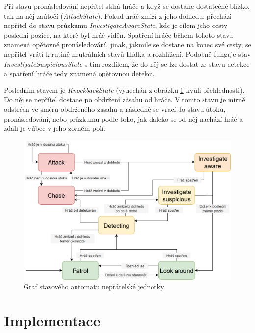 \documentclass[FM,Proj]{tulthesis}
\begin{document}
	Při stavu pronásledování nepřítel stíhá hráče a když se dostane dostatečně blízko, tak na něj zaútočí (\textit{AttackState}). Pokud hráč zmizí z jeho dohledu, přechází nepřítel do stavu průzkumu \textit{InvestigateAwareState}, kde je cílem jeho cesty poslední pozice, na které byl hráč viděn. Spatření hráče během tohoto stavu znamená opětovné pronásledování, jinak, jakmile se dostane na konec své cesty, se nepřítel vrátí k rutině neutrálních stavů hlídka a rozhlížení. Podobně funguje stav \textit{InvestigateSuspiciousState} s tím rozdílem, že do něj se lze dostat ze stavu detekce a spatření hráče tedy znamená opětovnou detekci.
	
	Posledním stavem je \textit{KnockbackState} (vynechán z obrázku \ref{imgFSM} kvůli přehlednosti). Do něj se nepřítel dostane po obdržení zásahu od hráče. V tomto stavu je mírně odstrčen ve směru obdrženého zásahu a následně se vrací do stavu útoku, pronásledování, nebo průzkumu podle toho, jak daleko se od něj nachází hráč a zdali je vůbec v jeho zorném poli.
	
	\begin{figure}[ht]
		\centering
		\includegraphics[width=\textwidth]{img/FSM}
		\caption{Graf stavového automatu nepřátelské jednotky}
		\label{imgFSM}
	\end{figure}
	
	
	\chapter{Implementace}
	\label{chp4}
	
\end{document}
